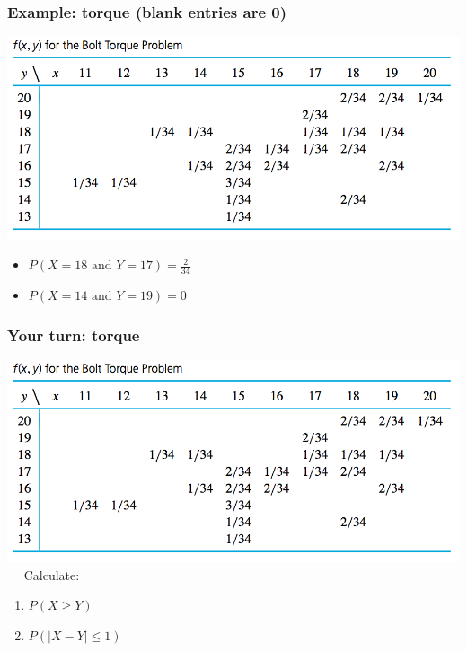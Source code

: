 \documentclass[handout]{beamer}\usepackage{graphicx, color}
\providecommand{\q}{$\quad$ \newline}
\numberwithin{equation}{section}
\begin{document}
\begin{frame}
\frametitle{Example: torque (blank entries are 0)}
 \includegraphics{../../fig/torquetable.png}
\begin{itemize}
\pause \item $P(X = 18 \text{ and } Y = 17) = \frac{2}{34}$
\pause \item $P(X = 14 \text{ and } Y = 19) = 0$
\end{itemize}
\end{frame}

\begin{frame}
\frametitle{Your turn: torque}
 \includegraphics{../../fig/torquetable.png}\q
Calculate:
\begin{enumerate}[1. ]
\item $P(X \ge Y)$
\item $P(|X-Y| \le 1)$
\end{enumerate}
\end{frame}
\end{document}
